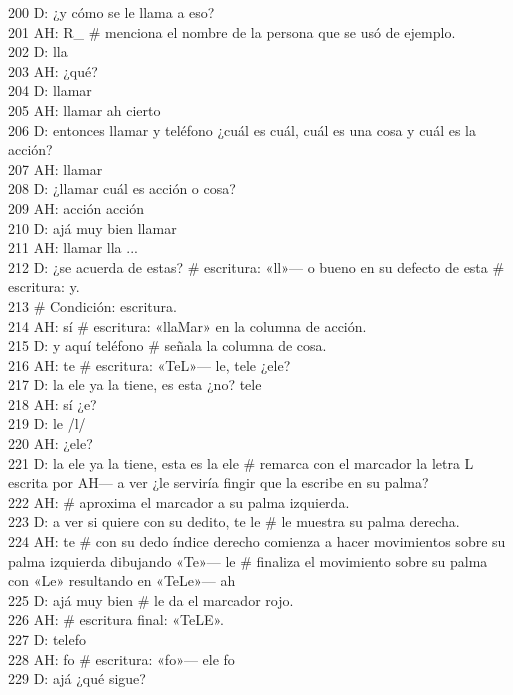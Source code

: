 200 D: ¿y cómo se le llama a eso?\\
201 AH: R\_ \# menciona el nombre de la persona que se usó de ejemplo.\\
202 D: lla\\
203 AH: ¿qué?\\
204 D: llamar\\
205 AH: llamar ah cierto\\
206 D: entonces llamar y teléfono ¿cuál es cuál, cuál es una cosa y cuál es la acción?\\
207 AH: llamar\\
208 D: ¿llamar cuál es acción o cosa?\\
209 AH: acción acción\\
210 D: ajá muy bien llamar\\
211 AH: llamar lla ...\\
212 D: ¿se acuerda de estas? \# escritura: «ll»--- o bueno en su defecto de esta \# escritura: y.\\
213 \# Condición: escritura.\\
214 AH: sí \# escritura: «llaMar» en la columna de acción.\\
215 D: y aquí teléfono \# señala la columna de cosa.\\
216 AH: te \# escritura: «TeL»--- le, tele ¿ele?\\
217 D: la ele ya la tiene, es esta ¿no? tele\\
218 AH: sí ¿e?\\
219 D: le /l/\\
220 AH: ¿ele?\\
221 D: la ele ya la tiene, esta es la ele \# remarca con el marcador la letra L escrita por AH--- a ver ¿le serviría fingir que la escribe en su palma?\\
222 AH: \# aproxima el marcador a su palma izquierda.\\
223 D: a ver si quiere con su dedito, te le \# le muestra su palma derecha.\\
224 AH: te \# con su dedo índice derecho comienza a hacer movimientos sobre su palma izquierda dibujando «Te»--- le \# finaliza el movimiento sobre su palma con «Le» resultando en «TeLe»--- ah\\
225 D: ajá muy bien \# le da el marcador rojo.\\
226 AH: \# escritura final: «TeLE».\\
227 D: telefo\\
228 AH: fo \# escritura: «fo»--- ele fo\\
229 D: ajá ¿qué sigue?\\
